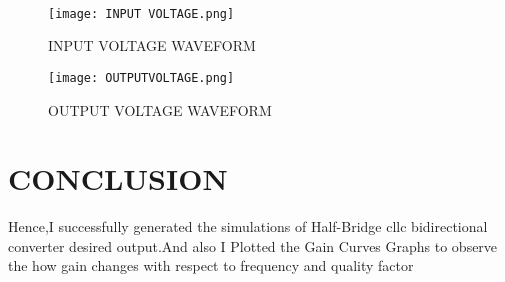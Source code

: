 \documentclass{book}
\begin{document}
    \paragraph{}
    \begin{figure}[ht]
		\centering
		\texttt{[image: INPUT VOLTAGE.png]} %
		\caption{INPUT VOLTAGE WAVEFORM}
		\label{fig:last_32}
		
	\end{figure}
    
    
    
	
	\begin{figure}[ht]
		\centering
		\texttt{[image: OUTPUTVOLTAGE.png]} %
		\caption{OUTPUT VOLTAGE WAVEFORM}
		\label{fig:last_32}
		
	\end{figure}
     
    \begin{bib}
       \cite{8055606}
    \cite{8797344}
    \cite{9947604}
    \cite{9807005}
    
    
      
    \end{bib}
    \section*{CONCLUSION}
    Hence,I successfully generated the simulations of Half-Bridge cllc bidirectional converter desired output.And also I Plotted the Gain Curves Graphs to observe the how gain changes with respect to frequency and quality factor 
    
     
	
  
    
    
	

	
	
	
 

	
	
	
	
	
	
\end{document}
